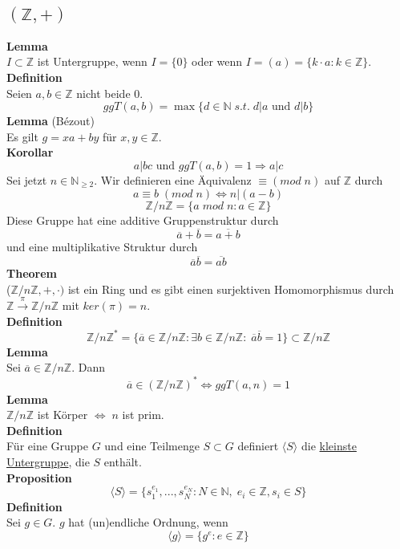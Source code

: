 \documentclass[a4paper, 12pt]{article}
\begin{document}
\subsection{$(\mathbb{Z}, +)$}
\textbf{Lemma}\\ $I\subset \mathbb{Z}$ ist Untergruppe, wenn $I = \{0\}$ oder wenn $I = (a) = \{k\cdot a: k \in \mathbb{Z}\}$.\\
\textbf{Definition}\\
Seien $a,b\in\mathbb{Z}$ nicht beide 0. \[ggT(a,b) = \max\{d \in \mathbb{N} \; s.t.\; d|a \text{ und } d|b\}\]
\textbf{Lemma} (Bézout)\\
Es gilt $g = xa+by$ für $x,y \in \mathbb{Z}$.\\
\textbf{Korollar}
\[a|bc \text{ und } ggT(a,b) = 1 \Rightarrow a|c\]
Sei jetzt $n \in \mathbb{N}_{\geq 2}$. Wir definieren eine Äquivalenz $\equiv (mod\; n)$ auf $\mathbb{Z}$ durch \[a\equiv b\; (mod\; n) \Leftrightarrow n|(a-b)\]
\[\mathbb{Z}/n\mathbb{Z} = \{a \;mod\; n: a\in\mathbb{Z}\}\]
Diese Gruppe hat eine additive Gruppenstruktur durch \[\overline{a} + \overline{b} = \overline{a+b}\] und eine multiplikative Struktur durch \[\overline{a}\overline{b} = \overline{ab}\]
\textbf{Theorem}\\
($\mathbb{Z}/n\mathbb{Z}, +, \cdot)$ ist ein Ring und es gibt einen surjektiven Homomorphismus durch $\mathbb{Z} \overset{\pi}{\to} \mathbb{Z}/n\mathbb{Z}$ mit $ker(\pi) = n$.\\
\textbf{Definition}\\
\[\mathbb{Z}/n\mathbb{Z}^* = \{\overline{a} \in \mathbb{Z}/n\mathbb{Z}: \exists b \in \mathbb{Z}/n\mathbb{Z}: \; \overline{a}\overline{b} = 1\} \subset \mathbb{Z}/n\mathbb{Z}\]
\textbf{Lemma}\\
Sei $\overline{a} \in \mathbb{Z}/n\mathbb{Z}$. Dann \[\overline{a} \in (\mathbb{Z}/n\mathbb{Z})^* \Leftrightarrow ggT(a,n) = 1\]
\textbf{Lemma}\\
$\mathbb{Z}/n\mathbb{Z}$ ist Körper $\Leftrightarrow\; n$ ist prim.\\
\textbf{Definition}\\
Für eine Gruppe $G$ und eine Teilmenge $S\subset G$ definiert $\langle S \rangle$ die \underline{kleinste Untergruppe}, die $S$ enthält.\\
\textbf{Proposition}
\[\langle S \rangle = \{s_1^{e_1}, ..., s_N^{e_N}: N \in \mathbb{N}, \; e_i \in \mathbb{Z}, s_i \in S\}\]
\textbf{Definition}\\
Sei $g\in G$. $g$ hat (un)endliche Ordnung, wenn \[\langle g \rangle = \{g^e: e \in \mathbb{Z}\}\]
\end{document}
